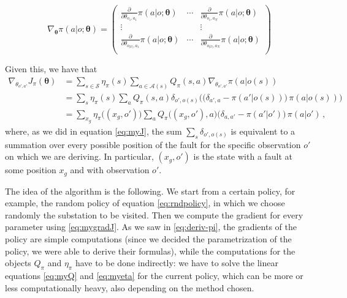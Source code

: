 \begin{equation}
    \nabla_{\boldsymbol \theta} \pi(a|o; \boldsymbol \theta) = \begin{pmatrix}
        \frac{\partial}{\partial \theta_{o_1,a_1}} \pi ( a | o; \boldsymbol \theta )
            & \cdots & \frac{\partial}{\partial \theta_{o_1,a_N}} \pi ( a | o; \boldsymbol \theta ) \\
        \vdots & &
        \vdots \\
        \frac{\partial}{\partial \theta_{o_{|\mathcal O|},a_1}} \pi ( a | o; \boldsymbol \theta ) 
            & \cdots & \frac{\partial}{\partial \theta_{o_{|\mathcal O|},a_N}} \pi ( a | o; \boldsymbol \theta ) \\
    \end{pmatrix}
\end{equation}

Given this, we have that
\begin{equation}
    \begin{aligned}
        \nabla_{\theta_{o',a'}} J_\pi (\boldsymbol \theta)
        &= \sum_{s \in \mathcal S} \eta_\pi(s) \sum_{a \in \mathcal A(s)} Q_\pi(s,a) \nabla_{\theta_{o',a'}} \pi(a|o(s)) \\
        &= \sum_s \eta_\pi(s) \sum_a Q_\pi(s,a) \delta_{o',o(s)} \Big( \big( \delta_{a',a} - \pi(a'|o(s)) \big) \, \pi(a|o(s)) \Big) \\
        &= \sum_{x_g} \eta_\pi \big((x_g, o') \big) \sum_a Q_\pi \big((x_g, o'),a \big) \big( \delta_{a,a'} - \pi(a'|o') \big) \, \pi(a|o') \, ,
    \end{aligned}
    \label{eq:mygradJ}
\end{equation}
where, as we did in equation \eqref{eq:myJ}, the sum $\sum_s \delta_{o', o(s)}$ is equivalent to a summation over every possible position of the fault for the specific observation $o'$ on which we are deriving. In particular, $(x_g, o')$ is the state with a fault at some position $x_g$ and with observation $o'$.

The idea of the algorithm is the following. We start from a certain policy, for example, the random policy of equation \eqref{eq:rndpolicy}, in which we choose randomly the substation to be visited. Then we compute the gradient for every parameter using \eqref{eq:mygradJ}. As we saw in \eqref{eq:deriv-pi}, the gradients of the policy are simple computations (since we decided the parametrization of the policy, we were able to derive their formulas), while the computations for the objects $Q_\pi$ and $\eta_\pi$ have to be done indirectly: we have to solve the linear equations \eqref{eq:myQ} and \eqref{eq:myeta} for the current policy, which can be more or less computationally heavy, also depending on the method chosen.

